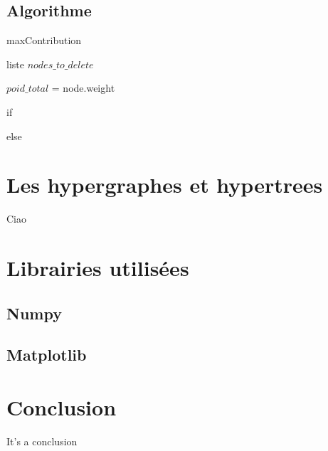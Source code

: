 \documentclass{article}
\begin{document}
	\subsection{Algorithme}
	
	\begin{algorithm}
	\caption{maxContribution}	
	\begin{algorithmic}[1]
	\REQUIRE liste $nodes\_to\_delete$

	\STATE$poid\_total$ = node.weight
	
	
	\STATE if

	\ELSE
	\STATE else
	\ENDIF


	
	\ENDFOR
	
	\end{algorithmic}
	\end{algorithm}

\section{Les hypergraphes et hypertrees}
	Ciao
	
\section{Librairies utilisées}

\subsection{Numpy}

\subsection{Matplotlib}

\section{Conclusion}
It's a conclusion
\end{document}
